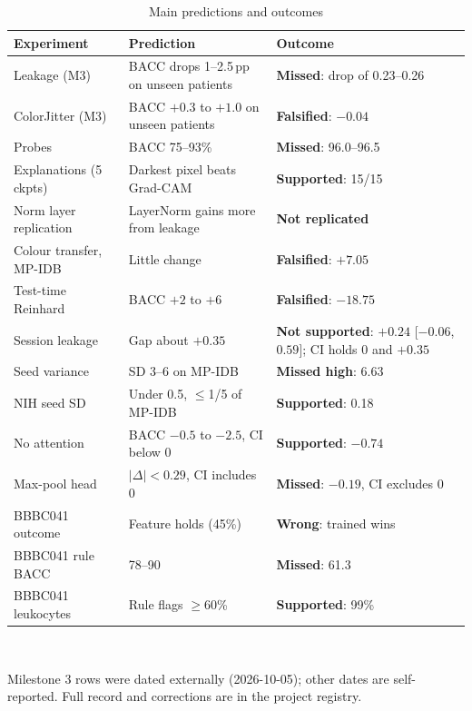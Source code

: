 \documentclass[conference]{IEEEtran}
\newcommand{\pp}{\,pp}
\begin{document}
\begin{table}[t]
\caption{Main predictions and outcomes}
\label{tab:record}
\centering
\scriptsize
\setlength{\tabcolsep}{2.5pt}
\begin{tabular}{@{}L{0.26\columnwidth}L{0.38\columnwidth}L{0.28\columnwidth}@{}}
\toprule
Experiment & Prediction & Outcome \\
\midrule
Leakage (M3) & BACC drops 1--2.5\pp{} on unseen patients & \textbf{Missed}: drop of 0.23--0.26 \\
ColorJitter (M3) & BACC $+0.3$ to $+1.0$ on unseen patients & \textbf{Falsified}: $-0.04$ \\
Probes & BACC 75--93\% & \textbf{Missed}: 96.0--96.5 \\
Explanations (5 ckpts) & Darkest pixel beats Grad-CAM & \textbf{Supported}: 15/15 \\
Norm layer replication & LayerNorm gains more from leakage & \textbf{Not replicated} \\
Colour transfer, MP-IDB & Little change & \textbf{Falsified}: $+7.05$ \\
Test-time Reinhard & BACC $+2$ to $+6$ & \textbf{Falsified}: $-18.75$ \\
Session leakage & Gap about $+0.35$ & \textbf{Not supported}: $+0.24$ [$-0.06$, $0.59$]; CI holds 0 and $+0.35$ \\
Seed variance & SD 3--6 on MP-IDB & \textbf{Missed high}: 6.63 \\
NIH seed SD & Under 0.5, $\le$1/5 of MP-IDB & \textbf{Supported}: 0.18 \\
No attention & BACC $-0.5$ to $-2.5$, CI below 0 & \textbf{Supported}: $-0.74$ \\
Max-pool head & $|\Delta|<0.29$, CI includes 0 & \textbf{Missed}: $-0.19$, CI excludes 0 \\
BBBC041 outcome & Feature holds (45\%) & \textbf{Wrong}: trained wins \\
BBBC041 rule BACC & 78--90 & \textbf{Missed}: 61.3 \\
BBBC041 leukocytes & Rule flags $\ge$60\% & \textbf{Supported}: 99\% \\
\bottomrule
\end{tabular}\\[2pt]
\raggedright\scriptsize Milestone 3 rows were dated externally (2026-10-05); other dates are self-reported. Full record and corrections are in the project registry.
\end{table}

\end{document}
